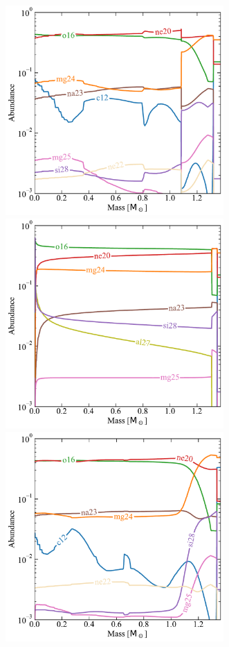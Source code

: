 \documentclass[main.tex]{subfiles}
\begin{document}
\begin{subappendices}
\begin{figure}[hbt!]
    \centering 
    \includegraphics[height=8cm]{figures/chapter2/abundances/2p1_eta1p58_Rho9.pdf}\quad
    \includegraphics[height=8cm]{figures/chapter2/abundances/2p1_eta1p58_final_abun.pdf}
    \includegraphics[height=8cm]{figures/chapter2/abundances/2p4_eta1p58_Rho9.pdf}\quad

\end{figure}
\end{subappendices}
\end{document}
